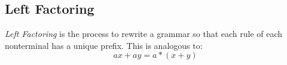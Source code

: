 \subsection{Left Factoring}
\begin{definition}
     \textit{Left Factoring} is the process to rewrite a grammar so that each rule
      of each nonterminal has a unique prefix.
      This is analogous to:
      \begin{equation}
          ax + ay = a * (x + y)
      \end{equation}


\end{definition}



